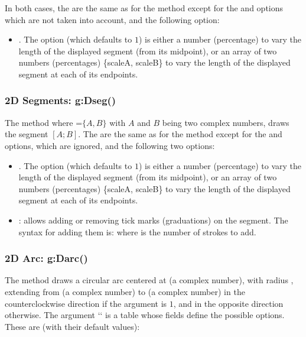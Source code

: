 In both cases, the  are the same as for the  method except for the  and  options which are not taken into account, and the following option:
\begin{itemize}
    \item {}. The option  (which defaults to $1$) is either a number (percentage) to vary the length of the displayed segment (from its midpoint), or an array of two numbers (percentages) \{scaleA, scaleB\} to vary the length of the displayed segment at each of its endpoints.
\end{itemize}

\subsubsection{2D Segments: g:Dseg()}

The method  where =$\{A,B\}$ with $A$ and $B$ being two complex numbers, draws the segment $[A;B]$. The  are the same as for the method  except for the  and  options, which are ignored, and the following two options:
\begin{itemize}
    \item {}. The option  (which defaults to $1$) is either a number (percentage) to vary the length of the displayed segment (from its midpoint), or an array of two numbers (percentages) \{scaleA, scaleB\} to vary the length of the displayed segment at each of its endpoints.
    
    \item {}: allows adding or removing tick marks (graduations) on the segment. The syntax for adding them is:  where  is the number of strokes to add.
\end{itemize}


\subsubsection{2D Arc: g:Darc()}

The  method draws a circular arc centered at  (a complex number), with radius , extending from  (a complex number) to  (a complex number) in the counterclockwise direction if the argument  is $1$, and in the opposite direction otherwise. The argument `` is a table whose fields define the possible options. These are (with their default values):

